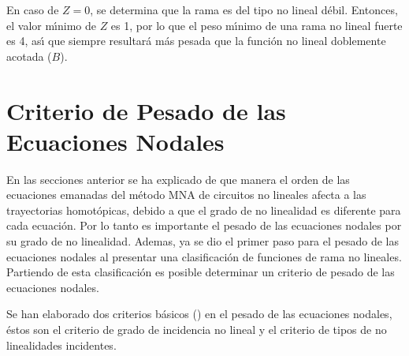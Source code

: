 \documentclass[conference,letterpaper,onecolumn]{IEEEtran}
\begin{document}
\begin{table}[!h]
\caption{Pesos de funciones de rama d\'ebilmente no lineales}
\label{PesoRamas}
\end{table}

En caso de $Z=0$, se determina que la rama es del tipo no lineal d\'ebil.
Entonces, el valor m\'{\i}nimo de $Z$ es 1, por lo que el peso
m\'{\i}nimo de una rama no lineal fuerte es 4, as\'{\i} que siempre
resultar\'a m\'as pesada que la funci\'on no lineal doblemente
acotada ($B$).   

\section{Criterio de Pesado de las Ecuaciones Nodales}
En las secciones anterior se ha explicado de que manera el orden de las ecuaciones
emanadas del m\'etodo MNA de circuitos no lineales afecta a las
trayectorias homot\'opicas, debido a que el grado de no linealidad es
diferente para cada ecuaci\'on.
Por lo tanto es importante el pesado de las ecuaciones nodales
por su grado de no linealidad. Ademas, ya se dio el primer paso para el pesado de
las ecuaciones nodales al presentar una clasificaci\'on de funciones
de rama no lineales. Partiendo de esta clasificaci\'on es posible
determinar un criterio de pesado de las ecuaciones nodales.

Se han elaborado dos criterios b\'asicos (\cite{homo_SMACD,homo_ICECS})
en el pesado de las ecuaciones
nodales, \'estos son el criterio de grado de incidencia no lineal
y el criterio de tipos de no linealidades incidentes.
\end{document}
